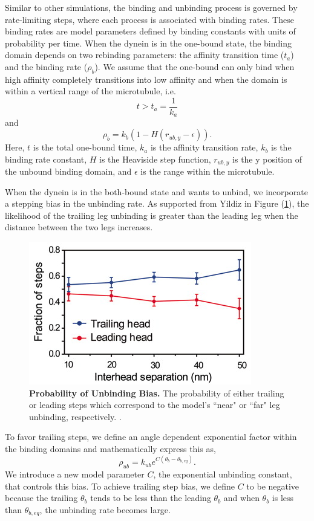Similar to other simulations, the binding and unbinding process is governed by rate-limiting steps, where each process is associated with binding rates. These binding rates are model parameters defined by binding constants with units of probability per time. When the dynein is in the one-bound state, the binding domain depends on two rebinding parameters: the affinity transition time ($t_a$) and the binding rate ($\rho_b$). We assume that the one-bound can only bind when high affinity completely transitions into low affinity and when the domain is within a vertical range of the microtubule, i.e.
\begin{equation}
	t>t_a=\frac{1}{k_a}
\end{equation}
and
\begin{equation}
	\rho_b=k_b(1-H(r_{ub,y}-\epsilon)).
\end{equation} 
Here, $t$ is the total one-bound time, $k_a$ is the affinity transition rate, $k_b$ is the binding rate constant, $H$ is the Heaviside step function, $r_{ub,y}$ is the y position of the unbound binding domain, and $\epsilon$ is the range within the microtubule.

When the dynein is in the both-bound state and wants to unbind, we incorporate a stepping bias in the unbinding rate. As supported from Yildiz in Figure (\ref{fig:trailingbias}), the likelihood of the trailing leg unbinding is greater than the leading leg when the distance between the two legs increases. 


\begin{figure}[H]
	\centering
	\includegraphics[width=0.6\columnwidth]{Figures/trailingbias.png}
	\caption[Probability of Unbinding Bias]{\textbf{Probability of Unbinding Bias.} The probability of either trailing or leading steps which correspond to the model's ``near" or ``far" leg unbinding, respectively. \cite{Dewitt2012}.}
	\label{fig:trailingbias}
\end{figure}

To favor trailing steps, we define an angle dependent exponential factor within the binding domains and mathematically express this as,
\begin{equation}
	\rho_{ub}=k_{ub}e^{C(\theta_b-\theta_{b,eq})}.
\end{equation}
We introduce a new model parameter $C$, the exponential unbinding constant, that controls this bias. To achieve trailing step bias, we define $C$ to be negative because the trailing $\theta_b$ tends to be less than the leading $\theta_b$ and  when $\theta_b$ is less than $\theta_{b,eq}$, the unbinding rate becomes large.


